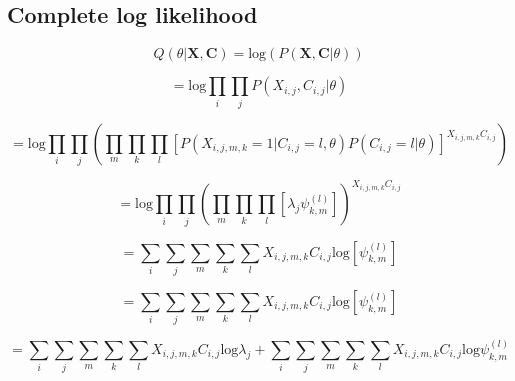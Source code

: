 \documentclass[12pt]{article}
\theoremstyle{definition}
\begin{document}
\subsection{Complete log likelihood}

\begin{equation}
	Q(\theta | \boldsymbol{X}, \boldsymbol{C}) = \textrm{log}(P(\boldsymbol{X}, \boldsymbol{C} | \theta))
\end{equation}

\begin{equation}
	= \textrm{log} \prod_{i}\prod_{j}P(X_{i,j}, C_{i,j} | \theta)
\end{equation}

\begin{equation}
	= \textrm{log}\prod_{i}\prod_{j} (\prod_{m}\prod_{k}\prod_{l}[P(X_{i,j,m,k}=1 | C_{i, j}=l, \theta)P(C_{i, j} = l | \theta)]^{X_{i,j,m,k} C_{i, j}})
\end{equation}

\begin{equation}
= \textrm{log} \prod_{i} \prod_{j} (\prod_{m} \prod_{k}\prod_{l}[\lambda_{j} \psi_{k, m}^{(l)}])^{X_{i,j,m,k} C_{i, j}}
\end{equation}

\begin{equation}
	=\sum_{i} \sum_{j} \sum_{m} \sum_{k} \sum_{l} X_{i,j,m,k} C_{i,j} \textrm{log}[\psi_{k, m}^{(l)}]
\end{equation}

\begin{equation}
=\sum_{i} \sum_{j} \sum_{m} \sum_{k} \sum_{l} X_{i,j,m,k} C_{i,j} \textrm{log}[\psi_{k, m}^{(l)}]
\end{equation}

\begin{equation}
=\sum_{i} \sum_{j} \sum_{m} \sum_{k} \sum_{l} X_{i,j,m,k} C_{i,j} \textrm{log} \lambda_{j} + \sum_{i} \sum_{j} \sum_{m} \sum_{k} \sum_{l} X_{i,j,m,k} C_{i,j} \textrm{log} \psi_{k, m}^{(l)}
\end{equation}
\end{document}
